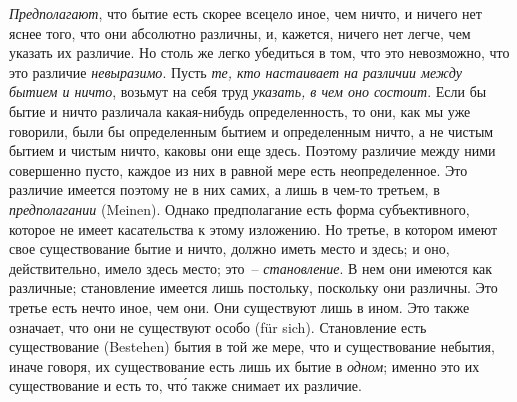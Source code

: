 \emph{Предполагают}, что бытие есть скорее всецело иное,
чем ничто, и ничего нет яснее того, что они абсолютно
различны, и, кажется, ничего нет легче, чем указать их
различие. Но столь же легко убедиться в том, что это невозможно,
что это различие \emph{невыразимо}. Пусть \emph{те, кто
настаивает на различии между бытием и ничто}, возьмут
на себя труд \emph{указать, в чем оно состоит}. Если бы бытие
и ничто различала какая-нибудь определенность, то они,
как мы уже говорили, были бы определенным бытием и
определенным ничто, а не чистым бытием и чистым ничто,
каковы они еще здесь. Поэтому различие между ними
совершенно пусто, каждое из них в равной мере есть
неопределенное. Это различие имеется поэтому не в них
самих, а лишь в чем-то третьем, в \emph{предполагании} (Meinen).
Однако предполагание есть форма субъективного,
которое не имеет касательства к этому изложению. Но
третье, в котором имеют свое существование бытие и ничто,
должно иметь место и здесь; и оно, действительно,
имело здесь место; это~-- \emph{становление}. В нем они имеются
как различные; становление имеется лишь постольку, поскольку
они различны. Это третье есть нечто иное, чем
они. Они существуют лишь в ином. Это также означает,
что они не существуют особо (für sich). Становление есть
существование (Bestehen) бытия в той же мере, что и существование
небытия, иначе говоря, их существование
есть лишь их бытие в \emph{одном}; именно это их существование
и есть то, чт\'о также снимает их различие.

